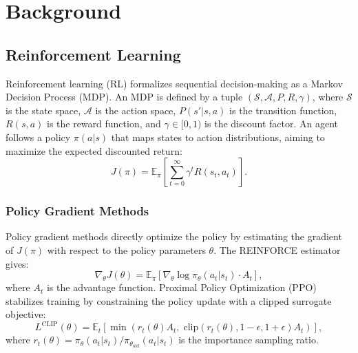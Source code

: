 \documentclass[12pt,a4paper]{article}
\begin{document}
\section{Background}
\label{sec:background}

\subsection{Reinforcement Learning}

Reinforcement learning (RL) formalizes sequential decision-making as a Markov Decision Process (MDP). An MDP is defined by a tuple $(\mathcal{S}, \mathcal{A}, P, R, \gamma)$, where $\mathcal{S}$ is the state space, $\mathcal{A}$ is the action space, $P(s' | s, a)$ is the transition function, $R(s, a)$ is the reward function, and $\gamma \in [0, 1)$ is the discount factor. An agent follows a policy $\pi(a | s)$ that maps states to action distributions, aiming to maximize the expected discounted return:
\begin{equation}
    J(\pi) = \mathbb{E}_\pi \left[ \sum_{t=0}^{\infty} \gamma^t R(s_t, a_t) \right].
\end{equation}

\subsubsection{Policy Gradient Methods}

Policy gradient methods directly optimize the policy by estimating the gradient of $J(\pi)$ with respect to the policy parameters $\theta$. The REINFORCE estimator \citep{williams1992simple} gives:
\begin{equation}
    \nabla_\theta J(\theta) = \mathbb{E}_\pi \left[ \nabla_\theta \log \pi_\theta(a_t | s_t) \cdot A_t \right],
\end{equation}
where $A_t$ is the advantage function. Proximal Policy Optimization (PPO) \citep{schulman2017proximal} stabilizes training by constraining the policy update with a clipped surrogate objective:
\begin{equation}
    L^{\text{CLIP}}(\theta) = \mathbb{E}_t \left[ \min\left( r_t(\theta) A_t, \; \text{clip}(r_t(\theta), 1 - \epsilon, 1 + \epsilon) A_t \right) \right],
    \label{eq:ppo}
\end{equation}
where $r_t(\theta) = \pi_\theta(a_t | s_t) / \pi_{\theta_\text{old}}(a_t | s_t)$ is the importance sampling ratio.
\end{document}
